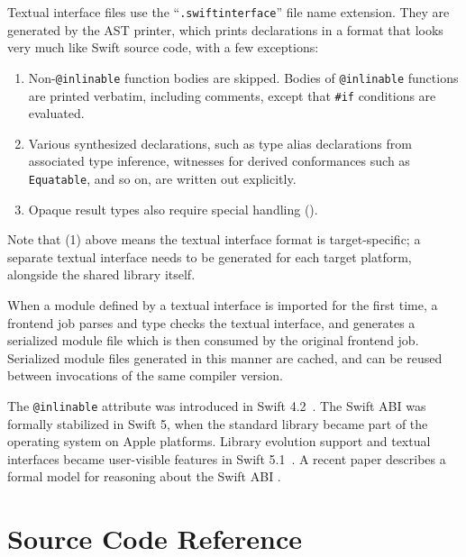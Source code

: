 \documentclass[../generics]{subfiles}
\begin{document}
Textual interface files use the ``\texttt{.swiftinterface}'' file name extension. They are generated by the AST printer, which prints declarations in a format that looks very much like Swift source code, with a few exceptions:
\begin{enumerate}
\item Non-\texttt{@inlinable} function bodies are skipped. Bodies of \texttt{@inlinable} functions are printed verbatim, including comments, except that \verb|#if| conditions are evaluated.
\item Various synthesized declarations, such as type alias declarations from associated type inference, witnesses for derived conformances such as \texttt{Equatable}, and so on, are written out explicitly.
\item Opaque result types also require special handling ().
\end{enumerate}
Note that (1) above means the textual interface format is target-specific; a separate textual interface needs to be generated for each target platform, alongside the shared library itself.

When a module defined by a textual interface is imported for the first time, a frontend job parses and type checks the textual interface, and generates a serialized module file which is then consumed by the original frontend job. Serialized module files generated in this manner are cached, and can be reused between invocations of the same compiler version.

The \texttt{@inlinable} attribute was introduced in Swift 4.2~\cite{se0193}. The Swift ABI was formally stabilized in Swift 5, when the standard library became part of the operating system on Apple platforms. Library evolution support and textual interfaces became user-visible features in Swift 5.1~\cite{se0260}. A recent paper describes a formal model for reasoning about the Swift ABI \cite{formalabi}.

\section{Source Code Reference}\label{src:compilation model}
\end{document}
